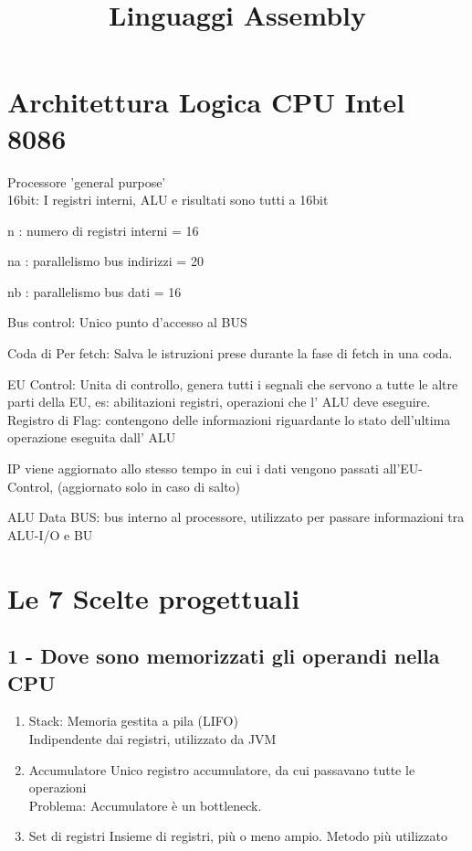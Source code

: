 \documentclass{article}
\title{Linguaggi Assembly}
\begin{document}
\section{Architettura Logica CPU Intel 8086}
Processore 'general purpose'
\\
16bit: I registri interni, ALU e risultati sono tutti a 16bit

n : numero di registri interni = 16

na : parallelismo bus indirizzi = 20

nb : parallelismo bus dati = 16



Bus control: Unico punto d'accesso al BUS

Coda di Per fetch: Salva le istruzioni prese durante la fase di fetch in una coda.

EU Control: Unita di controllo, genera tutti i segnali che servono a tutte le altre parti della EU, es: abilitazioni registri, operazioni che l' ALU deve eseguire.
\\
Registro di Flag: contengono delle informazioni riguardante lo stato dell'ultima operazione eseguita dall' ALU

IP viene aggiornato allo stesso tempo in cui i dati vengono passati all'EU-Control, (aggiornato solo in caso di salto)

ALU Data BUS: bus interno al processore, utilizzato per passare informazioni tra ALU-I/O e BU

\section{Le 7 Scelte progettuali}
\subsection{1 - Dove sono memorizzati gli operandi nella CPU}

\begin{enumerate}
    \item Stack:
        Memoria gestita a pila (LIFO)
        \\
        Indipendente dai registri, utilizzato da JVM
    \item Accumulatore
        Unico registro accumulatore, da cui passavano tutte le operazioni
        \\
        Problema: Accumulatore è un bottleneck.
    \item Set di registri
        Insieme di registri, più o meno ampio. Metodo più utilizzato
\end{enumerate}
\end{document}
